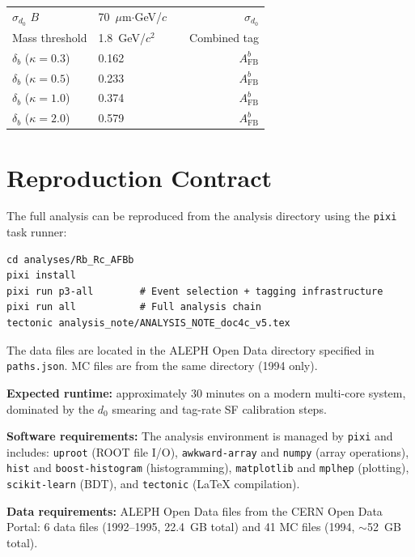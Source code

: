 \documentclass[11pt,a4paper]{article}
\begin{document}
\begin{table}[htbp]
\begin{tabular}{lllr}
$\sigma_{d_0}$ $B$ & 70~$\mu$m$\cdot$GeV/$c$ & \cite{ALEPH:Rb:precise} & $\sigma_{d_0}$ \\
Mass threshold & 1.8~GeV/$c^2$ & \cite{ALEPH:Rb:1996} & Combined tag \\
$\delta_b$ ($\kappa = 0.3$) & 0.162 & \cite{LEP:EWWG:2005} & $A_\text{FB}^b$ \\
$\delta_b$ ($\kappa = 0.5$) & 0.233 & \cite{LEP:EWWG:2005} & $A_\text{FB}^b$ \\
$\delta_b$ ($\kappa = 1.0$) & 0.374 & \cite{LEP:EWWG:2005} & $A_\text{FB}^b$ \\
$\delta_b$ ($\kappa = 2.0$) & 0.579 & \cite{LEP:EWWG:2005} & $A_\text{FB}^b$ \\
\bottomrule
\end{tabular}
\end{table}

\section{Reproduction Contract}
\label{app:reproduction}

The full analysis can be reproduced from the analysis directory
using the \texttt{pixi} task runner:

\begin{verbatim}
cd analyses/Rb_Rc_AFBb
pixi install
pixi run p3-all        # Event selection + tagging infrastructure
pixi run all           # Full analysis chain
tectonic analysis_note/ANALYSIS_NOTE_doc4c_v5.tex
\end{verbatim}

\noindent
The data files are located in the ALEPH Open Data directory
specified in \texttt{paths.json}.
MC files are from the same directory (1994 only).

\noindent
\textbf{Expected runtime:} approximately 30 minutes on a modern
multi-core system, dominated by the $d_0$ smearing and tag-rate
SF calibration steps.

\noindent
\textbf{Software requirements:} The analysis environment is
managed by \texttt{pixi} and includes: \texttt{uproot} (ROOT file
I/O), \texttt{awkward-array} and \texttt{numpy} (array operations),
\texttt{hist} and \texttt{boost-histogram} (histogramming),
\texttt{matplotlib} and \texttt{mplhep} (plotting),
\texttt{scikit-learn} (BDT), and \texttt{tectonic} (LaTeX
compilation).

\noindent
\textbf{Data requirements:} ALEPH Open Data files from the CERN
Open Data Portal: 6 data files (1992--1995, 22.4~GB total) and
41 MC files (1994, $\sim$52~GB total).
\end{document}
